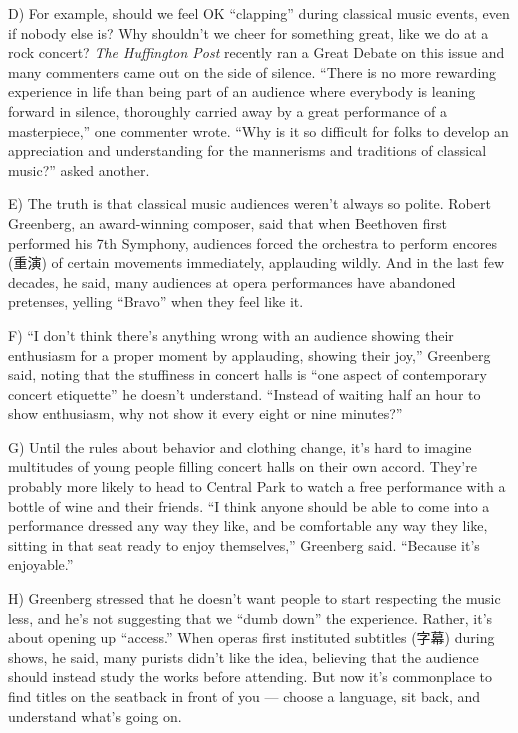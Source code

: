 \documentclass[UTF8,11pt]{ctexart}
\begin{document}
D) For example, should we feel OK “clapping” during classical music events, even if nobody else is? Why shouldn’t we cheer for something great, like we do at a rock concert? \textit{The Huffington Post} recently ran a Great Debate on this issue and many commenters came out on the side of silence. “There is no more rewarding experience in life than being part of an audience where everybody is leaning forward in silence, thoroughly carried away by a great performance of a masterpiece,” one commenter wrote. “Why is it so difficult for folks to develop an appreciation and understanding for the mannerisms and traditions of classical music?” asked another.


E) The truth is that classical music audiences weren’t always so polite. Robert Greenberg, an award-winning composer, said that when Beethoven first performed his 7th Symphony, audiences forced the orchestra to perform encores (重演) of certain movements immediately, applauding wildly. And in the last few decades, he said, many audiences at opera performances have abandoned pretenses, yelling “Bravo” when they feel like it.


F) “I don’t think there’s anything wrong with an audience showing their enthusiasm for a proper moment by applauding, showing their joy,” Greenberg said, noting that the stuffiness in concert halls is “one aspect of contemporary concert etiquette” he doesn’t understand. “Instead of waiting half an hour to show enthusiasm, why not show it every eight or nine minutes?”


G) Until the rules about behavior and clothing change, it’s hard to imagine multitudes of young people filling concert halls on their own accord. They’re probably more likely to head to Central Park to watch a free performance with a bottle of wine and their friends. “I think anyone should be able to come into a performance dressed any way they like, and be comfortable any way they like, sitting in that seat ready to enjoy themselves,” Greenberg said. “Because it’s enjoyable.”


H) Greenberg stressed that he doesn’t want people to start respecting the music less, and he’s not suggesting that we “dumb down” the experience. Rather, it’s about opening up “access.” When operas first instituted subtitles (字幕) during shows, he said, many purists didn’t like the idea, believing that the audience should instead study the works before attending. But now it’s commonplace to find titles on the seatback in front of you — choose a language, sit back, and understand what’s going on.
\end{document}
